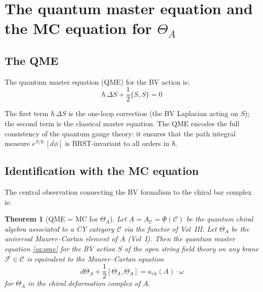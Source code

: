 \documentclass[11pt]{amsart}
\theoremstyle{plain}
\newtheorem{theorem}{Theorem}[section]
\theoremstyle{definition}
\theoremstyle{remark}
\newcommand{\cC}{\mathcal{C}}
\newcommand{\cF}{\mathcal{F}}
\begin{document}
\section{The quantum master equation and the MC equation for $\Theta_A$}
\label{sec:qme}

\subsection{The QME}
\label{subsec:qme-statement}

The quantum master equation (QME) for the BV action is:
\begin{equation}\label{eq:qme}
 \boxed{
 \hbar\, \Delta S + \frac{1}{2}\{S, S\} = 0
 }
\end{equation}

The first term $\hbar\, \Delta S$ is the one-loop correction (the BV Laplacian acting on $S$); the second term is the classical master equation. The QME encodes the full consistency of the quantum gauge theory: it ensures that the path integral measure $e^{S/\hbar}\, [d\phi]$ is BRST-invariant to all orders in $\hbar$.

\subsection{Identification with the MC equation}
\label{subsec:qme-mc}

The central observation connecting the BV formalism to the chiral bar complex is:

\begin{theorem}[QME = MC for $\Theta_A$]
\label{thm:qme-mc}
Let $A = A_\cC = \Phi(\cC)$ be the quantum chiral algebra associated to a CY category $\cC$ via the functor of Vol~III. Let $\Theta_A$ be the universal Maurer--Cartan element of $A$ (Vol~I). Then the quantum master equation \eqref{eq:qme} for the BV action $S$ of the open string field theory on any brane $\cF \in \cC$ is equivalent to the Maurer--Cartan equation
\begin{equation}\label{eq:mc-equation}
 d\Theta_A + \frac{1}{2}[\Theta_A, \Theta_A] = \kappa_{\mathrm{ch}}(A) \cdot \omega
\end{equation}
for $\Theta_A$ in the chiral deformation complex of $A$.
\end{theorem}
\end{document}
